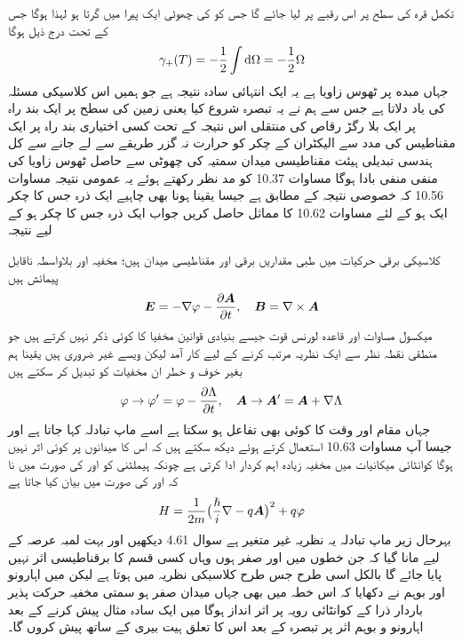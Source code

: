 تکمل قرہ کی سطح پر اس رقبے پر لیا جائے گا جس کو  کی چھوٹی ایک پیرا میں گرتا ہو لہذا  ہوگا جس کے تحت درج ذیل ہوگا 
\begin{align} 
\gamma_{+} (T) = - \frac{1}{2} \int \dif \Omega = - \frac{1}{2} \Omega
\end{align}
جہاں مبده پر ٹھوس زاویا  ہے یہ ایک انتہائی سادہ نتیجہ ہے جو ہمیں اس کلاسیکی مسئلہ کی یاد دلاتا ہے جس سے ہم نے یہ تبصرہ شروع کیا یعنی زمین کی سطح پر ایک بند راہ پر ایک بلا رگڑ   رقاص   کی منتقلی اس نتیجہ کے تحت کسی اختیاری بند راہ پر ایک مقناطیس کی مدد سے الیکٹران کے چکر کو حرارت نہ گزر طریقے سے لے جانے سے کل ہندسی تبدیلی ہیئت مقناطیسی میدان سمتیہ کی چھوٹی سے حاصل ٹھوس زاویا کی منفی منفی بادا ہوگا مساوات 10.37 کو مد نظر رکھتے ہوئے یہ عمومی نتیجہ مساوات 10.56 کہ خصوصی نتیجہ کے مطابق ہے جیسا یقینا ہونا بھی چاہیے 
ایک ذرہ جس کا چکر ایک ہو کے لئے مساوات 10.62 کا مماثل حاصل کریں جواب  ایک ذرہ جس کا چکر  ہو کے لیے نتیجہ  


کلاسیکی برقی حرکیات میں طبی مقداریں برقی اور مقناطیسی میدان ہیں؛ مخفیہ  اور  بلاواسطہ ناقابل پیمائش ہیں 
\begin{align}
{\ensuremath{{\boldsymbol{E}}}} = - \nabla \varphi - \frac{\partial {\ensuremath{{\boldsymbol{A}}}}}{\partial t}, \quad {\ensuremath{{\boldsymbol{B}}}} = \nabla \times {\ensuremath{{\boldsymbol{A}}}}
\end{align}
میکسول مساوات اور قاعدہ لورنس قوت جیسے بنیادی قوانین مخفیا کا کوئی ذکر نہیں کرتے ہیں جو منطقی نقطہ نظر سے ایک نظریہ  مرتب کرنے  کے لیے کار آمد لیکن ویسے غیر ضروری ہیں یقینا ہم بغیر خوف و خطر ان مخفیات کو تبدیل کر سکتے ہیں 
\begin{align}
\varphi \to \varphi' = \varphi - \frac{\partial \Lambda}{\partial t}, \quad {\ensuremath{{\boldsymbol{A}}}} \to {\ensuremath{{\boldsymbol{A}}}}' = {{\boldsymbol{A}}} + \nabla \Lambda
\end{align}
جہاں  مقام اور وقت کا کوئی بھی تفاعل ہو سکتا ہے اسے ماپ تبادلہ کہا جاتا ہے اور جیسا آپ مساوات 10.63 استعمال کرتے ہوئے دیکھ سکتے ہیں کہ اس کا میدانوں پر کوئی اثر نہیں ہوگا کوانٹائی میکانیات میں مخفیہ زیادہ اہم کردار ادا کرتی ہے چونکہ ہیملٹنی کو  اور  کی صورت میں نا کہ  اور  کی صورت میں بیان کیا جاتا ہے 
\begin{align}
H = \frac{1}{2m} \big ( \frac{\hslash}{i} \nabla - q {{\boldsymbol{A}}} \big )^2 + q \varphi
\end{align}
بہرحال  زیر ماپ تبادلہ یہ نظریہ  غیر متغیر ہے سوال 4.61 دیکھیں اور بہت لمبہ  عرصہ کے لیے مانا گیا کہ  جن خطوں میں   اور  صفر ہوں وہاں کسی قسم کا برقناطیسی اثر نہیں پایا جائے گا بالکل اسی طرح جس طرح کلاسیکی نظریہ میں ہوتا ہے لیکن  میں اہارونو اور بوہم نے دکھایا کہ اس خطہ میں بھی جہاں میدان صفر ہو سمتی مخفیہ حرکت پذیر باردار ذرا کے کوانٹائی رویہ پر اثر انداز ہوگا میں ایک سادہ مثال پیش کرنے کے بعد اہارونو و بوہم   اثر پر تبصرہ کے بعد اس کا تعلق ہیت بیری کے ساتھ پیش کروں گا۔


